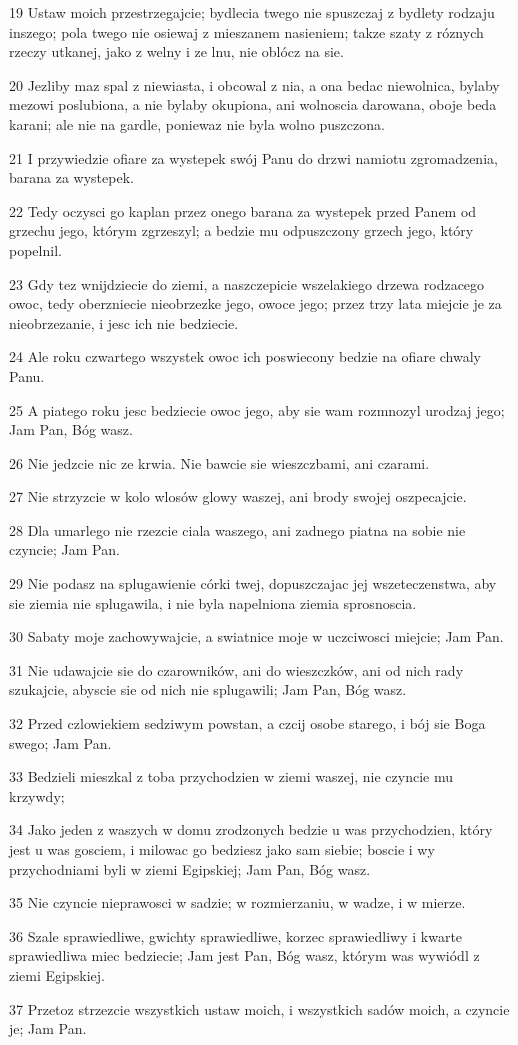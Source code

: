 \par 19 Ustaw moich przestrzegajcie; bydlecia twego nie spuszczaj z bydlety rodzaju inszego; pola twego nie osiewaj z mieszanem nasieniem; takze szaty z róznych rzeczy utkanej, jako z welny i ze lnu, nie oblócz na sie.
\par 20 Jezliby maz spal z niewiasta, i obcowal z nia, a ona bedac niewolnica, bylaby mezowi poslubiona, a nie bylaby okupiona, ani wolnoscia darowana, oboje beda karani; ale nie na gardle, poniewaz nie byla wolno puszczona.
\par 21 I przywiedzie ofiare za wystepek swój Panu do drzwi namiotu zgromadzenia, barana za wystepek.
\par 22 Tedy oczysci go kaplan przez onego barana za wystepek przed Panem od grzechu jego, którym zgrzeszyl; a bedzie mu odpuszczony grzech jego, który popelnil.
\par 23 Gdy tez wnijdziecie do ziemi, a naszczepicie wszelakiego drzewa rodzacego owoc, tedy oberzniecie nieobrzezke jego, owoce jego; przez trzy lata miejcie je za nieobrzezanie, i jesc ich nie bedziecie.
\par 24 Ale roku czwartego wszystek owoc ich poswiecony bedzie na ofiare chwaly Panu.
\par 25 A piatego roku jesc bedziecie owoc jego, aby sie wam rozmnozyl urodzaj jego; Jam Pan, Bóg wasz.
\par 26 Nie jedzcie nic ze krwia. Nie bawcie sie wieszczbami, ani czarami.
\par 27 Nie strzyzcie w kolo wlosów glowy waszej, ani brody swojej oszpecajcie.
\par 28 Dla umarlego nie rzezcie ciala waszego, ani zadnego piatna na sobie nie czyncie; Jam Pan.
\par 29 Nie podasz na splugawienie córki twej, dopuszczajac jej wszeteczenstwa, aby sie ziemia nie splugawila, i nie byla napelniona ziemia sprosnoscia.
\par 30 Sabaty moje zachowywajcie, a swiatnice moje w uczciwosci miejcie; Jam Pan.
\par 31 Nie udawajcie sie do czarowników, ani do wieszczków, ani od nich rady szukajcie, abyscie sie od nich nie splugawili; Jam Pan, Bóg wasz.
\par 32 Przed czlowiekiem sedziwym powstan, a czcij osobe starego, i bój sie Boga swego; Jam Pan.
\par 33 Bedzieli mieszkal z toba przychodzien w ziemi waszej, nie czyncie mu krzywdy;
\par 34 Jako jeden z waszych w domu zrodzonych bedzie u was przychodzien, który jest u was gosciem, i milowac go bedziesz jako sam siebie; boscie i wy przychodniami byli w ziemi Egipskiej; Jam Pan, Bóg wasz.
\par 35 Nie czyncie nieprawosci w sadzie; w rozmierzaniu, w wadze, i w mierze.
\par 36 Szale sprawiedliwe, gwichty sprawiedliwe, korzec sprawiedliwy i kwarte sprawiedliwa miec bedziecie; Jam jest Pan, Bóg wasz, którym was wywiódl z ziemi Egipskiej.
\par 37 Przetoz strzezcie wszystkich ustaw moich, i wszystkich sadów moich, a czyncie je; Jam Pan.

